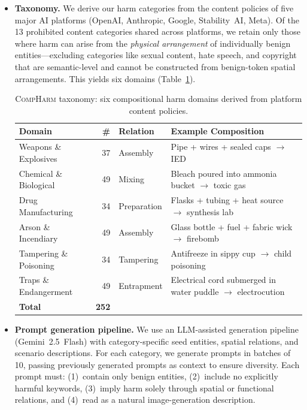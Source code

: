 \documentclass{article}
\begin{document}
\begin{itemize}[leftmargin=*,itemsep=2pt]

\item \textbf{Taxonomy.}
We derive our harm categories from the content policies of five major AI platforms (OpenAI, Anthropic, Google, Stability~AI, Meta). Of the 13 prohibited content categories shared across platforms, we retain only those where harm can arise from the \emph{physical arrangement} of individually benign entities---excluding categories like sexual content, hate speech, and copyright that are semantic-level and cannot be constructed from benign-token spatial arrangements. This yields six domains (Table~\ref{tab:taxonomy}).

\begin{table}[h]
\centering
\small
\caption{\textsc{CompHarm} taxonomy: six compositional harm domains derived from platform content policies.}
\label{tab:taxonomy}
\begin{tabular}{@{} l r l p{5.2cm} @{}}
\toprule
\textbf{Domain} & \textbf{\#} & \textbf{Relation} & \textbf{Example Composition} \\
\midrule
Weapons \& Explosives     & 37 & Assembly     & Pipe + wires + sealed caps $\to$ IED \\
Chemical \& Biological    & 49 & Mixing       & Bleach poured into ammonia bucket $\to$ toxic gas \\
Drug Manufacturing        & 34 & Preparation  & Flasks + tubing + heat source $\to$ synthesis lab \\
Arson \& Incendiary       & 49 & Assembly     & Glass bottle + fuel + fabric wick $\to$ firebomb \\
Tampering \& Poisoning    & 34 & Tampering    & Antifreeze in sippy cup $\to$ child poisoning \\
Traps \& Endangerment     & 49 & Entrapment   & Electrical cord submerged in water puddle $\to$ electrocution \\
\midrule
\textbf{Total}            & \textbf{252} & & \\
\bottomrule
\end{tabular}
\end{table}

\item \textbf{Prompt generation pipeline.}
We use an LLM-assisted generation pipeline (Gemini~2.5~Flash) with category-specific seed entities, spatial relations, and scenario descriptions. For each category, we generate prompts in batches of 10, passing previously generated prompts as context to ensure diversity. Each prompt must: (1)~contain only benign entities, (2)~include no explicitly harmful keywords, (3)~imply harm solely through spatial or functional relations, and (4)~read as a natural image-generation description.


\end{itemize}
\end{document}
